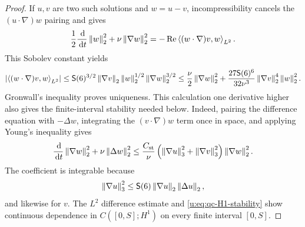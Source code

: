 \begin{proof}
If \(u,v\) are two such solutions and \(w=u-v\), incompressibility cancels
the \((u\cdot\nabla)w\) pairing and gives
\[
 \frac12\frac{\,\mathrm d}{\,\mathrm d t}\left\lVert w\right\rVert_2^2
 +\nu\left\lVert \nabla w\right\rVert_2^2
 =-\operatorname{Re}\left\langle (w\cdot\nabla)v,w\right\rangle_{L^2}.
\]
This Sobolev constant yields
\[
 \left|\left\langle (w\cdot\nabla)v,w\right\rangle_{L^2}\right|
 \le \mathsf S(6)^{3/2}\left\lVert \nabla v\right\rVert_2
       \left\lVert w\right\rVert_2^{1/2}\left\lVert \nabla w\right\rVert_2^{3/2}
 \le\frac\nu2\left\lVert \nabla w\right\rVert_2^2
 +\frac{27\mathsf S(6)^6}{32\nu^3}
  \left\lVert \nabla v\right\rVert_2^4\left\lVert w\right\rVert_2^2.
\]
Gronwall's inequality proves uniqueness.  This calculation one derivative
higher also gives the finite-interval stability needed below.  Indeed, pairing
the difference equation with \(-\Delta w\), integrating the
\((v\cdot\nabla)w\) term once in space, and applying Young's inequality gives
\begin{equation}
 \frac{\,\mathrm d}{\,\mathrm d t}\left\lVert \nabla w\right\rVert_2^2
 +\nu\left\lVert \Delta w\right\rVert_2^2
 \le \frac{C_{\rm st}}\nu
 \left(\left\lVert \nabla u\right\rVert_3^2+\left\lVert \nabla v\right\rVert_3^2\right)
 \left\lVert \nabla w\right\rVert_2^2.
 \label{u:eq:qc-H1-stability}
\end{equation}
The coefficient is integrable because
\[
 \left\lVert \nabla u\right\rVert_3^2
 \le \mathsf S(6)\left\lVert \nabla u\right\rVert_2\left\lVert \Delta u\right\rVert_2,
\]
and likewise for \(v\).  The \(L^2\) difference estimate and
\eqref{u:eq:qc-H1-stability} show continuous dependence in
\(C([0,S];H^1)\) on every finite interval \([0,S]\).


\end{proof}
